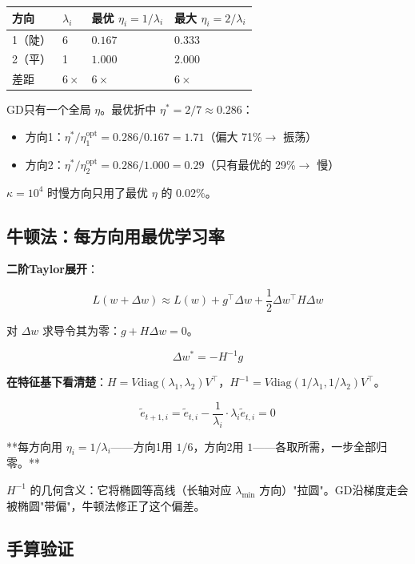 \documentclass[12pt,a4paper]{article}
\begin{document}
\begin{center}\small
\begin{longtable}{|l|l|l|l|}
\hline
方向 & $\lambda_i$ & 最优 $\eta_i = 1/\lambda_i$ & 最大 $\eta_i = 2/\lambda_i$ \\
\hline
1（陡） & 6 & $0.167$ & $0.333$ \\
2（平） & 1 & $1.000$ & $2.000$ \\
差距 & $6\times$ & $6\times$ & $6\times$ \\
\hline
\end{longtable}
\end{center}


GD只有一个全局 $\eta$。最优折中 $\eta^* = 2/7 \approx 0.286$：

\begin{itemize}[leftmargin=*,nosep]
\item 方向1：$\eta^*/\eta_1^{\text{opt}} = 0.286/0.167 = 1.71$（偏大 71\%$\to$ 振荡）
\item 方向2：$\eta^*/\eta_2^{\text{opt}} = 0.286/1.000 = 0.29$（只有最优的 29\%$\to$ 慢）
\end{itemize}


$\kappa = 10^4$ 时慢方向只用了最优 $\eta$ 的 $0.02\%$。


\subsection{牛顿法：每方向用最优学习率}

\textbf{二阶Taylor展开}：


\[L(w + \Delta w) \approx L(w) + g^\top \Delta w + \frac{1}{2}\Delta w^\top H \Delta w\]

对 $\Delta w$ 求导令其为零：$g + H\Delta w = 0$。


\[\Delta w^* = -H^{-1}g\]

\textbf{在特征基下看清楚}：$H = V\text{diag}(\lambda_1,\lambda_2)V^\top$，$H^{-1} = V\text{diag}(1/\lambda_1, 1/\lambda_2)V^\top$。


\[\tilde{e}_{t+1,i} = \tilde{e}_{t,i} - \frac{1}{\lambda_i} \cdot \lambda_i \tilde{e}_{t,i} = 0\]

**每方向用 $\eta_i = 1/\lambda_i$——方向1用 $1/6$，方向2用 $1$——各取所需，一步全部归零。**

$H^{-1}$ 的几何含义：它将椭圆等高线（长轴对应 $\lambda_{\min}$ 方向）"拉圆"。GD沿梯度走会被椭圆"带偏"，牛顿法修正了这个偏差。


\subsection{手算验证}
\end{document}
